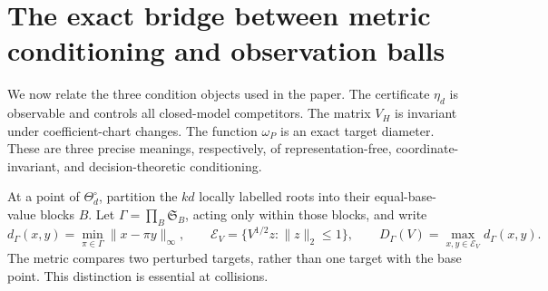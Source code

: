 \section{The exact bridge between metric conditioning and observation balls}
\label{sec:modulus-bridge}
We now relate the three condition objects used in the paper. The
certificate $\eta_d$ is observable and controls all closed-model
competitors. The matrix $V_H$ is invariant under coefficient-chart
changes. The function $\omega_P$ is an exact target diameter. These
are three precise meanings, respectively, of representation-free,
coordinate-invariant, and decision-theoretic conditioning.

At a point of $\Theta_d^\circ$, partition the $kd$ locally labelled
roots into their equal-base-value blocks $B$. Let
$\Gamma=\prod_B\mathfrak S_B$, acting only within those blocks, and
write
\[
 d_\Gamma(x,y)=\min_{\pi\in\Gamma}\|x-\pi y\|_\infty,
 \qquad
 \mathcal E_V=\{V^{1/2}z:\|z\|_2\le1\},\qquad
 D_\Gamma(V)=\max_{x,y\in\mathcal E_V}d_\Gamma(x,y).
\]
The metric compares two perturbed targets, rather than one target
with the base point. This distinction is essential at collisions.

